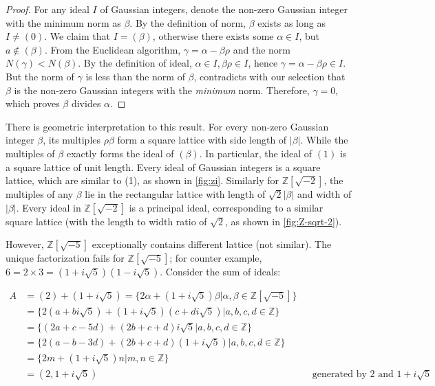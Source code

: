 \documentclass[b5paper]{article}
\begin{document}
\begin{proof}
For any ideal $I$ of Gaussian integers, denote the non-zero Gaussian integer with the minimum norm as $\beta$. By the definition of norm, $\beta$ exists as long as $I \ne (0)$. We claim that $I = (\beta)$, otherwise there exists some $\alpha \in I$, but $a \notin (\beta)$. From the Euclidean algorithm, $\gamma = \alpha - \beta \rho$ and the norm $N(\gamma) < N(\beta)$. By the definition of ideal, $\alpha \in I, \beta \rho \in I$, hence $\gamma = \alpha - \beta \rho \in I$. But the norm of $\gamma$ is less than the norm of $\beta$, contradicts with our selection that $\beta$ is the non-zero Gaussian integers with the \emph{minimum} norm. Therefore, $\gamma = 0$, which proves $\beta$ divides $\alpha$.
\end{proof}

There is geometric interpretation to this result. For every non-zero Gaussian integer $\beta$, its multiples $\rho \beta$ form a square lattice with side length of $|\beta|$. While the multiples of $\beta$ exactly forms the ideal of $(\beta)$. In particular, the ideal of $(1)$ is a square lattice of unit length. Every ideal of Gaussian integers is a square lattice, which are similar to (1), as shown in \cref{fig:zi}. Similarly for $\mathbb{Z}[\sqrt{-2}]$, the multiples of any $\beta$ lie in the rectangular lattice with length of $\sqrt{2}|\beta|$ and width of $|\beta|$. Every ideal in $\mathbb{Z}[\sqrt{-2}]$ is a principal ideal, corresponding to a similar square lattice (with the length to width ratio of $\sqrt{2}$, as shown in \cref{fig:Z-sqrt-2}).

However, $\mathbb{Z}[\sqrt{-5}]$ exceptionally contains different lattice (not similar). The unique factorization fails for $\mathbb{Z}[\sqrt{-5}]$; for counter example, $6 = 2 \times 3 = (1 + i\sqrt{5})(1 - i\sqrt{5})$. Consider the sum of ideals:

\begin{align*}
A &= (2) + (1 + i\sqrt{5}) = \{2\alpha + (1 + i\sqrt{5})\beta | \alpha, \beta \in \mathbb{Z}[\sqrt{-5}]\} \\
  &= \{2(a + bi\sqrt{5}) + (1 + i\sqrt{5})(c + di\sqrt{5}) | a, b, c, d \in \mathbb{Z}\} \\
  &= \{(2a + c - 5d) + (2b + c + d)i\sqrt{5} | a, b, c, d \in \mathbb{Z} \} \\
  &= \{2(a - b - 3d) + (2b + c + d)(1 + i\sqrt{5}) | a, b, c, d \in \mathbb{Z} \} \\
  &= \{2m + (1 + i\sqrt{5})n | m, n \in \mathbb{Z} \} \\
  &= (2, 1 + i\sqrt{5}) && \text{generated by }2 \text{ and } 1+ i\sqrt{5}
\end{align*}
\end{document}
